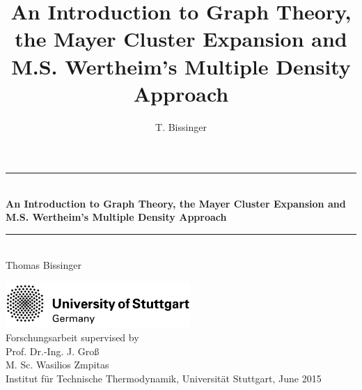 \documentclass[8.5pt,twoside,twocolumn]{article}
\title{An Introduction to Graph Theory, the Mayer Cluster Expansion and M.S. Wertheim's Multiple Density Approach}
\author{T. Bissinger}
\theoremstyle{standard}
\begin{document}
\begin{titlepage}

\begin{center}


 


\newcommand{\HRule}{\rule{\linewidth}{0.5mm}}

\HRule \\[0.4cm]

{ \huge \bfseries An Introduction to Graph Theory, the Mayer Cluster Expansion and M.S. Wertheim's Multiple Density Approach}


\HRule \\[2cm]

{\LARGE Thomas Bissinger}\\[4cm]

\vfill 

\includegraphics[width=7cm]{./Figures/unistuttgart.jpg}\\[2cm]   

{\Large Forschungsarbeit supervised by \\[.7cm]
Prof. Dr.-Ing. J. Groß \\[.4cm]
M. Sc. Wasilios Zmpitas}\\[.4cm]


{ \Large  Institut für Technische Thermodynamik, Universität Stuttgart, June 2015}




\end{center}


\end{titlepage}
\newpage
\newpage
\clearpage



{}
\end{document}
